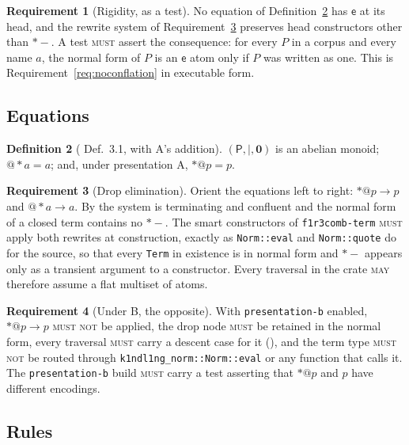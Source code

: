 \documentclass[11pt,a4paper]{article}
\makeatletter
\newcommand{\code}[1]{\texttt{#1}}
\newcommand{\MUST}{\textsc{must}}
\newcommand{\MUSTNOT}{\textsc{must not}}
\newcommand{\MAY}{\textsc{may}}
\newcommand{\quo}[1]{@#1}
\newcommand{\drp}[1]{{*}#1}
\newcommand{\nil}{\mathbf{0}}
\newcommand{\Psort}{\mathsf{P}}
\newcommand{\ev}{\mathsf{e}}
\theoremstyle{definition}
\newtheorem{definition}{Definition}[section]
\newtheorem{requirement}[definition]{Requirement}
\theoremstyle{plain}
\makeatother
\begin{document}
\begin{requirement}[Rigidity, as a test]\label{req:rigid}
No equation of Definition~\ref{def:teqns} has $\ev$ at its head, and the
rewrite system of Requirement~\ref{req:dropelim} preserves head constructors
other than $\drp{-}$. A test \MUST{} assert the consequence: for every $P$ in
a corpus and every name $a$, the normal form of $P$ is an $\ev$ atom only if
$P$ was written as one. This is Requirement~\ref{req:noconflation} in
executable form.
\end{requirement}

\subsection{Equations}

\begin{definition}[\cite{draft3} Def.~3.1, with A's addition]\label{def:teqns}
$(\Psort,\mid,\nil)$ is an abelian monoid; $\quo{\drp{a}} = a$; and, under
presentation A, $\drp{\quo{p}} = p$.
\end{definition}

\begin{requirement}[Drop elimination]\label{req:dropelim}
Orient the equations left to right: $\drp{\quo{p}} \to p$ and
$\quo{\drp{a}} \to a$. By \cite[Lem.~2.8]{logic} the system is terminating
and confluent and the normal form of a closed term contains no $\drp{-}$. The
smart constructors of \code{f1r3comb-term} \MUST{} apply both rewrites at
construction, exactly as \code{Norm::eval} and \code{Norm::quote} do for the
source, so that every \code{Term} in existence is in normal form and
$\drp{-}$ appears only as a transient argument to a constructor. Every
traversal in the crate \MAY{} therefore assume a flat multiset of atoms.
\end{requirement}

\begin{requirement}[Under B, the opposite]\label{req:nodropB}
With \code{presentation-b} enabled, $\drp{\quo{p}} \to p$ \MUSTNOT{} be
applied, the drop node \MUST{} be retained in the normal form, every traversal
\MUST{} carry a descent case for it (\cite[Prop.~2.4(iii)]{logic}), and the
term type \MUSTNOT{} be routed through \code{k1ndl1ng\_norm::Norm::eval} or
any function that calls it. The \code{presentation-b} build \MUST{} carry a
test asserting that $\drp{\quo{p}}$ and $p$ have different encodings.
\end{requirement}

\subsection{Rules}
\end{document}
